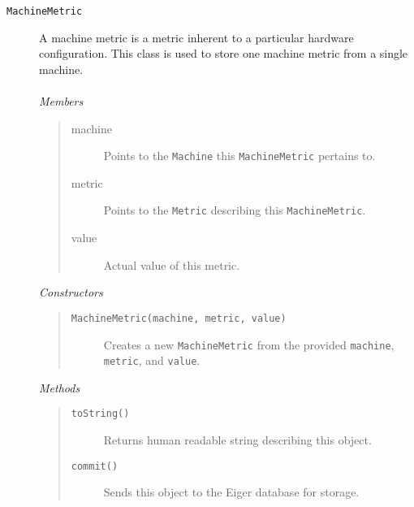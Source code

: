 \begin{description}
\item[\texttt{MachineMetric}] A machine metric is a metric inherent to a particular hardware configuration.
  This class is used to store one machine metric from a single machine.\\ \\
  {\em Members}
	\begin{quote}
	\begin{description}
    \item[machine] Points to the \texttt{Machine} this \texttt{MachineMetric} pertains to.
    \item[metric] Points to the \texttt{Metric} describing this \texttt{MachineMetric}.
    \item[value] Actual value of this metric.
	\end{description}
	\end{quote}
  {\em Constructors}
	\begin{quote}
	\begin{description}
    \item[\texttt{MachineMetric(machine, metric, value)}] Creates a new \texttt{MachineMetric} from the provided \texttt{machine}, \texttt{metric}, and \texttt{value}.
	\end{description}
	\end{quote}
	{\em Methods}
	\begin{quote}
	\begin{description}
		\item[\texttt{toString()}] Returns human readable string describing this object.
	\item[\texttt{commit()}] Sends this object to the Eiger database for storage.
	\end{description}
	\end{quote}


\end{description}
